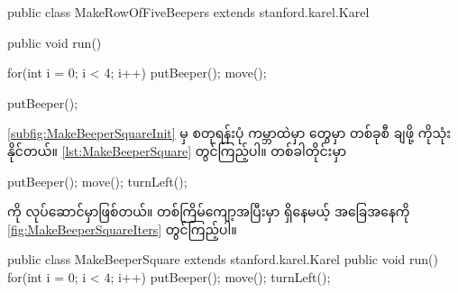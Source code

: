 \begin{sloppypar}
\begin{lstcodesimple}[float, caption={ပထမစမ်းကြည့်ပုံ}, 
                        label={lst:MakeRowOfFiveBeepersFixedOffByOne}]
public class MakeRowOfFiveBeepers extends stanford.karel.Karel{
    public void run(){
            for(int i = 0; i < 4; i++) {
                    putBeeper();
                    move();
            }

            putBeeper();
    }
}
\end{lstcodesimple}

\Fig \vref{subfig:MakeBeeperSquareInit} မှ စတုရန်းပုံ ကမ္ဘာထဲမှာ \mmcorner တွေမှာ \mmbeeper တစ်ခုစီ ချဖို့ \enForLoop ကိုသုံးနိုင်တယ်။  \Lst \vref*{lst:MakeBeeperSquare} တွင်ကြည့်ပါ။ \mmiteration တစ်ခါတိုင်းမှာ 
\begin{lstcodeminimal}[]
putBeeper();
move();
turnLeft();    
\end{lstcodeminimal}

\noindent ကို လုပ်ဆောင်မှာဖြစ်တယ်။ တစ်ကြိမ်ကျော့အပြီးမှာ ရှိနေမယ့် အခြေအနေကို \Fig \vref*{fig:MakeBeeperSquareIters} တွင်ကြည့်ပါ။
\begin{lstcodesimple}[float, caption={စတုရန်းပုံ ဘိပါ}, label={lst:MakeBeeperSquare}]
public class MakeBeeperSquare extends stanford.karel.Karel{
        public void run(){
                for(int i = 0; i < 4; i++) {
                        putBeeper();
                        move();
                        turnLeft();
                }
        }
}
\end{lstcodesimple}


\end{sloppypar}
